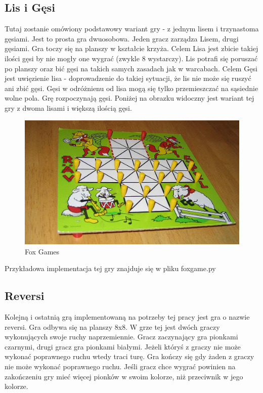 \documentclass[declaration,shortabstract,inz]{iithesis}
\begin{document}
\subsection{Lis i Gęsi}
Tutaj zostanie omówiony podstawowy wariant gry - z jednym lisem i trzynastoma gęsiami.
Jest to prosta gra dwuosobowa. Jeden gracz zarządza Lisem, drugi gęsiami.
Gra toczy się na planszy w kształcie krzyża.
Celem Lisa jest zbicie takiej ilości gęsi by nie mogły one wygrać (zwykle 8 wystarczy).
Lis potrafi się poruszać po planszy oraz bić gęsi na takich samych zasadach jak w warcabach.
Celem Gęsi jest uwięzienie lisa - doprowadzenie do takiej sytuacji, że lis nie może się ruszyć ani zbić gęsi.
Gęsi w odróżnienu od lisa mogą się tylko przemieszczać na sąsiednie wolne pola.
Grę rozpoczynają gęsi.
Poniżej na obrazku widoczny jest wariant tej gry z dwoma lisami i większą ilością gęsi.
\begin{figure}[H]
  \includegraphics[scale=0.25]{./images/foxgames.jpg}
  \centering
  \caption{Fox Games}
  \label{fig:fg}
\end{figure}

Przykładowa implementacja tej gry znajduje się w pliku fox\textunderscore game.py

\subsection{Reversi}
Kolejną i ostatnią grą implementowaną na potrzeby tej pracy jest gra o nazwie reversi.
Gra odbywa się na planszy 8x8.
W grze tej jest dwóch graczy wykonujących swoje ruchy naprzemiennie.
Gracz zaczynający gra pionkami czarnymi, drugi gracz gra pionkami białymi.
Jeżeli któryś z graczy nie może wykonać poprawnego ruchu wtedy traci turę.
Gra kończy się gdy żaden z graczy nie może wykonać poprawnego ruchu.
Jeśli gracz chce wygrać powinien na zakończeniu gry mieć więcej pionków w swoim kolorze, niż przeciwnik w jego kolorze.
\end{document}
